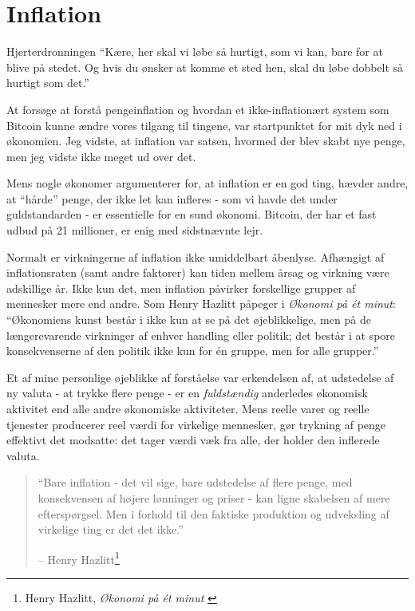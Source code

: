 \chapter{Inflation}
\label{les:9}

\begin{chapquote}{Hjerterdronningen}
\enquote{Kære, her skal vi løbe så hurtigt, som vi kan, bare for at blive på stedet. Og hvis du ønsker at komme et sted hen, skal du løbe dobbelt så hurtigt som det.}
\end{chapquote}

At forsøge at forstå pengeinflation og hvordan et ikke-inflationært system som Bitcoin kunne ændre vores tilgang til tingene, var startpunktet for mit dyk ned i økonomien. Jeg vidste, at inflation var satsen, hvormed der blev skabt nye penge, men jeg vidste ikke meget ud over det.

Mens nogle økonomer argumenterer for, at inflation er en god ting, hævder andre, at \enquote{hårde} penge, der ikke let kan infleres - som vi havde det under guldstandarden - er essentielle for en sund økonomi. Bitcoin, der har et fast udbud på 21 millioner, er enig med sidstnævnte lejr.

Normalt er virkningerne af inflation ikke umiddelbart åbenlyse. Afhængigt af inflationsraten (samt andre faktorer) kan tiden mellem årsag og virkning være adskillige år. Ikke kun det, men inflation påvirker forskellige grupper af mennesker mere end andre. Som Henry Hazlitt påpeger i \textit{Økonomi på ét minut}: \enquote{Økonomiens kunst består i ikke kun at se på det øjeblikkelige, men på de længerevarende virkninger af enhver handling eller politik; det består i at spore konsekvenserne af den politik ikke kun for én gruppe, men for alle grupper.}

Et af mine personlige øjeblikke af forståelse var erkendelsen af, at udstedelse af ny valuta - at trykke flere penge - er en \textit{fuldstændig} anderledes økonomisk aktivitet end alle andre økonomiske aktiviteter. Mens reelle varer og reelle tjenester producerer reel værdi for virkelige mennesker, gør trykning af penge effektivt det modsatte: det tager værdi væk fra alle, der holder den inflerede valuta.

\begin{quotation}\begin{samepage}
\enquote{Bare inflation - det vil sige, bare udstedelse af flere penge, med konsekvensen af højere lønninger og priser - kan ligne skabelsen af mere efterspørgsel. Men i forhold til den faktiske produktion og udveksling af virkelige ting er det det ikke.}
\begin{flushright} -- Henry Hazlitt\footnote{Henry Hazlitt, \textit{Økonomi på ét minut} \cite{hazlitt}}
\end{flushright}\end{samepage}\end{quotation}

